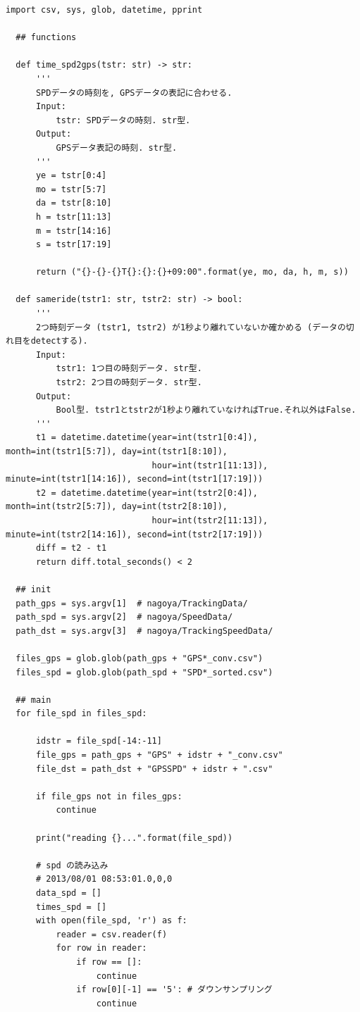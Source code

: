 \documentclass[twocolumn, a4paper, 9pt]{jarticle}
\begin{document}
\begin{lstlisting}[caption=spdgps.py, label=spdgps]
  import csv, sys, glob, datetime, pprint

  ## functions
  
  def time_spd2gps(tstr: str) -> str:
      '''
      SPDデータの時刻を, GPSデータの表記に合わせる. 
      Input: 
          tstr: SPDデータの時刻. str型. 
      Output:
          GPSデータ表記の時刻. str型. 
      '''
      ye = tstr[0:4]
      mo = tstr[5:7]
      da = tstr[8:10]
      h = tstr[11:13]
      m = tstr[14:16]
      s = tstr[17:19]
  
      return ("{}-{}-{}T{}:{}:{}+09:00".format(ye, mo, da, h, m, s))
  
  def sameride(tstr1: str, tstr2: str) -> bool:
      '''
      2つ時刻データ (tstr1, tstr2) が1秒より離れていないか確かめる (データの切れ目をdetectする).
      Input:
          tstr1: 1つ目の時刻データ. str型.
          tstr2: 2つ目の時刻データ. str型.
      Output:
          Bool型. tstr1とtstr2が1秒より離れていなければTrue.それ以外はFalse.
      '''
      t1 = datetime.datetime(year=int(tstr1[0:4]), month=int(tstr1[5:7]), day=int(tstr1[8:10]),
                             hour=int(tstr1[11:13]), minute=int(tstr1[14:16]), second=int(tstr1[17:19]))
      t2 = datetime.datetime(year=int(tstr2[0:4]), month=int(tstr2[5:7]), day=int(tstr2[8:10]),
                             hour=int(tstr2[11:13]), minute=int(tstr2[14:16]), second=int(tstr2[17:19]))
      diff = t2 - t1
      return diff.total_seconds() < 2
  
  ## init
  path_gps = sys.argv[1]  # nagoya/TrackingData/
  path_spd = sys.argv[2]  # nagoya/SpeedData/
  path_dst = sys.argv[3]  # nagoya/TrackingSpeedData/
  
  files_gps = glob.glob(path_gps + "GPS*_conv.csv")
  files_spd = glob.glob(path_spd + "SPD*_sorted.csv")
  
  ## main
  for file_spd in files_spd:
  
      idstr = file_spd[-14:-11]
      file_gps = path_gps + "GPS" + idstr + "_conv.csv"
      file_dst = path_dst + "GPSSPD" + idstr + ".csv"
  
      if file_gps not in files_gps:
          continue
  
      print("reading {}...".format(file_spd))
  
      # spd の読み込み
      # 2013/08/01 08:53:01.0,0,0
      data_spd = []
      times_spd = []
      with open(file_spd, 'r') as f:
          reader = csv.reader(f)
          for row in reader:
              if row == []:
                  continue
              if row[0][-1] == '5': # ダウンサンプリング
                  continue
  

\end{lstlisting}
\end{document}
